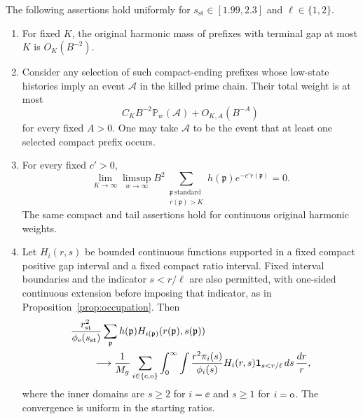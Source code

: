 \begin{proposition}\label{prop:prime-occupation}
The following assertions hold uniformly for
$s_{\mathrm{st}}\in[1.99,2.3]$ and $\ell\in\{1,2\}$.
\begin{enumerate}[label=\textup{(\roman*)}]
\item For fixed $K$, the original harmonic mass of prefixes with
terminal gap at most $K$ is $O_K(B^{-2})$.
\item Consider any selection of such compact-ending prefixes whose
low-state histories imply an event $\mathcal A$ in the killed prime
chain.  Their total weight is at most
\begin{equation}\label{eq:prime-compact-event}
 C_K B^{-2}\mathbb P_w(\mathcal A)+O_{K,A}(B^{-A})
\end{equation}
for every fixed $A>0$.  One may take $\mathcal A$ to be the event that
at least one selected compact prefix occurs.
\item For every fixed $c'>0$,
\begin{equation}\label{eq:prime-tail}
 \lim_{K\to\infty}\limsup_{w\to\infty}
 B^2\sum_{\substack{\mathfrak p\ \mathrm{standard}\\r(\mathfrak p)>K}}
       h(\mathfrak p)e^{-c'r(\mathfrak p)}=0.
\end{equation}
The same compact and tail assertions hold for continuous original
harmonic weights.
\item Let $H_i(r,s)$ be bounded continuous functions supported in a
fixed compact positive gap interval and a fixed compact ratio interval.
Fixed interval boundaries and the indicator $s<r/\ell$ are also
permitted, with one-sided continuous extension before imposing that
indicator, as in Proposition~\ref{prop:occupation}.  Then
\begin{align}\label{eq:prime-occupation}
 &\frac{r_{\mathrm{st}}^2}{\phi_\mathrm e(s_{\mathrm{st}})}
   \sum_{\mathfrak p}h(\mathfrak p)
        H_{i(\mathfrak p)}(r(\mathfrak p),s(\mathfrak p))\notag\\
 &\hspace{8mm}\longrightarrow
 \frac1{M_g}\sum_{i\in\{\mathrm e,\mathrm o\}}
   \int_0^\infty\int
    \frac{r^2\pi_i(s)}{\phi_i(s)}H_i(r,s)
       \mathbf 1_{s<r/\ell}\,ds\,\frac{dr}{r},
\end{align}
where the inner domains are $s\geq2$ for $i=\ee$ and $s\geq1$ for
$i=\mathrm o$.  The convergence is uniform in the starting ratios.
\end{enumerate}
\end{proposition}

